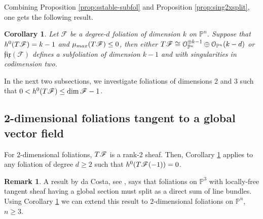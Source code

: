 \documentclass[twoside]{amsart}
\numberwithin{equation}{section}
\newcommand{\p}[1]{{\mathbb{P}^{#1}}}
\newcommand{\opn}{{\mathcal O}_{\mathbb{P}^{n}}}
\newcommand{\pn}{{\mathbb{P}^{n}}}
\newcommand{\sI}{\mathscr{I}}
\DeclareMathOperator{\sing}{Sing}
\DeclareMathOperator{\rk}{rk}
\DeclareMathOperator{\codim}{codim}
\newcommand{\inext}{{\mathcal E}{\it xt}}
\newcommand{\sF}{\mathscr{F}}
\newcommand{\sG}{\mathscr{G}}
\newcommand{\tF}{{\rm T}\sF}
\newcommand{\nG}{{\rm N}\sG}
\newcommand{\fix}{\mathfrak{fix}}
\newtheorem{corollary}[theorem]{Corollary}
\theoremstyle{definition}
\newtheorem{remark}{Remark}[section]
\begin{document}


 
Combining Proposition \ref{prop:sstable-subfol} and Proposition \ref{prop:sing2xsplit}, one gets the following result.
\begin{corollary}\label{cor:sub-sing-cod2}
Let $\sF$ be a degree-$d$ foliation of dimension $k$ on $\pn$. Suppose that $h^0(\tF) = k -1$ and $\mu_{\rm max}(\tF) \leq 0$, then either $\tF \cong \opn^{\oplus k-1} \oplus \opn(k-d)$ or $\fix(\sF)$ defines a subfoliation of dimension $k-1$ and with singularities in codimension two.
\end{corollary}


In the next two subsections, we investigate foliations of dimensions 2 and 3 such that $0 < h^0(\tF) \leq \dim \sF -1$.




\subsection{2-dimensional foliations tangent to a global vector field}
For 2-dimensional foliations, $\tF$ is a rank-2 sheaf. Then, Corollary \ref{cor:sub-sing-cod2} applies to any foliation of degree $d\geq 2$ such that  $h^0(\tF(-1)) = 0$. 


\begin{remark}\label{rem:raphael}
A result by da Costa, see \cite[Theorem C]{C}, says that foliations on $\p3$ with locally-free tangent sheaf having a global section must split as a direct sum of line bundles. Using Corollary \ref{cor:sub-sing-cod2} we can extend this result to $2$-dimensional foliations on $\pn$, $n\geq 3$. 
\end{remark}


\end{document}
